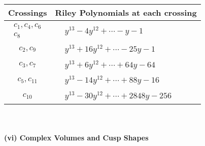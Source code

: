 \documentclass[1p]{elsarticle_modified}
\theoremstyle{definition}
\begin{document}
\begin{tabular}{m{50pt}|m{274pt}}
Crossings & \hspace{64pt}Riley Polynomials at each crossing \\
\hline $$\begin{aligned}c_{1},c_{4},c_{6}\\c_{8}\end{aligned}$$&$\begin{aligned}
&y^{13}-4 y^{12}+\cdots- y-1
\end{aligned}$\\
\hline $$\begin{aligned}c_{2},c_{9}\end{aligned}$$&$\begin{aligned}
&y^{13}+16 y^{12}+\cdots-25 y-1
\end{aligned}$\\
\hline $$\begin{aligned}c_{3},c_{7}\end{aligned}$$&$\begin{aligned}
&y^{13}+6 y^{12}+\cdots+64 y-64
\end{aligned}$\\
\hline $$\begin{aligned}c_{5},c_{11}\end{aligned}$$&$\begin{aligned}
&y^{13}-14 y^{12}+\cdots+88 y-16
\end{aligned}$\\
\hline $$\begin{aligned}c_{10}\end{aligned}$$&$\begin{aligned}
&y^{13}-30 y^{12}+\cdots+2848 y-256
\end{aligned}$\\
\hline
\end{tabular}\\~\\
\newpage\flushleft \textbf{(vi) Complex Volumes and Cusp Shapes}
\end{document}
